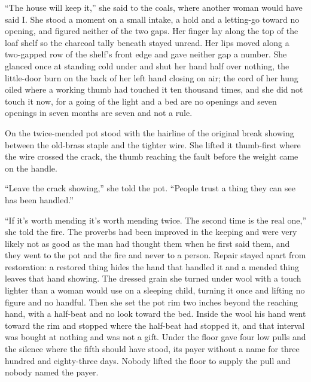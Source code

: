 “The house will keep it,” she said to the coals, where another woman would have said I. She stood a moment on a small intake, a hold and a letting-go toward no opening, and figured neither of the two gaps. Her finger lay along the top of the loaf shelf so the charcoal tally beneath stayed unread. Her lips moved along a two-gapped row of the shelf's front edge and gave neither gap a number. She glanced once at  standing cold under  and shut her hand half over nothing, the little-door burn on the back of her left hand closing on air; the cord of her  hung oiled where a working thumb had touched it ten thousand times, and she did not touch it now, for a going of the light and a bed are no openings and seven openings in seven months are seven and not a rule.

On  the twice-mended pot stood with the hairline of the original break showing between the old-brass staple and the tighter wire. She lifted it thumb-first where the wire crossed the crack, the thumb reaching the fault before the weight came on the handle.

“Leave the crack showing,” she told the pot. “People trust a thing they can see has been handled.”

“If it's worth mending it's worth mending twice. The second time is the real one,” she told the fire. The proverbs had been improved in the keeping and were very likely not as good as the man had thought them when he first said them, and they went to the pot and the fire and never to a person. Repair stayed apart from restoration: a restored thing hides the hand that handled it and a mended thing leaves that hand showing. The dressed grain she turned under wool with a touch lighter than a woman would use on a sleeping child, turning it once and lifting no figure and no handful. Then she set the pot rim two inches beyond the reaching hand, with a half-beat and no look toward the bed. Inside the wool his hand went toward the rim and stopped where the half-beat had stopped it, and that interval was bought at nothing and was not a gift. Under the floor  gave four low pulls and the silence where the fifth should have stood, its payer without a name for three hundred and eighty-three days. Nobody lifted the floor to supply the pull and nobody named the payer.

\scenebreak

